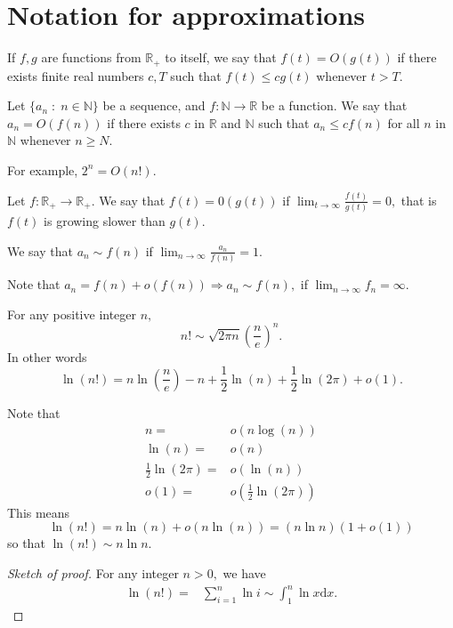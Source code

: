 \section{Notation for approximations}
\begin{definition}[O notation]
	If $f,g$ are functions from $\mathbb{R}_+$ to itself, we say that $f(t) = O(g(t))$ if
	there exists finite real numbers $c, T$ such that $ f(t) \leq c g(t)$ whenever $ t > T.$
\end{definition}

\begin{definition}
	Let $ \{ a_n \; : \; n \in \mathbb{N} \}$ be a sequence,
	and $ f\colon \mathbb{N} \to \mathbb{R}$ be a function.
	We say that $a_n = O(f(n))$ if there exists $ c $ in $\mathbb{R}$ and 
	$\mathbb{N}$ such that $ a_n \leq c f(n)$ for all $n $ in 
	$\mathbb{N}$ whenever $n \geq N.$
\end{definition}
For example, $2^n = O(n!).$
\begin{definition}
	Let $f \colon \mathbb{R}_+ \to \mathbb{R}_+.$
	We say that $f(t) = 0(g(t))$ if $\lim_{t \to \infty} \frac{f(t)}{g(t)} = 0,$
	that is $f(t)$ is growing slower than $g(t).$
\end{definition}
\begin{example}
	We say that $a_n \sim f(n)$ if $\lim_{n \to \infty} \frac{a_n}{f(n)} = 1.$	
\end{example}
Note that $a_n = f(n) + o(f(n)) \Rightarrow a_n \sim f(n),$ if $\lim_{n \to \infty} 
f_n = \infty.$
\begin{theorem}
	For any positive integer $n,$
	$$ n! \sim \sqrt{2 \pi n} \left( \frac{n}{e} \right)^n .$$
	In other words
	$$ \ln(n!) = n \ln \left( \frac{n}{e}  \right) - n + \frac{1}{2} \ln(n)
	+ \frac{1}{2} \ln(2 \pi ) + o(1).$$
\end{theorem}

\begin{remark}
	Note that
	\begin{align*}
		n ={}&  o(n \log (n)) \\
		\ln(n)={}& o(n) \\
		\frac{1}{2} \ln(2 \pi) ={}& o(\ln(n))\\
		o(1) ={}& o\left( \frac{1}{2} \ln(2 \pi) \right)
	\end{align*}
	This means 
	$$ \ln(n!) = n \ln(n) + o(n \ln(n)) = (n \ln n)(1 + o(1))$$
	so that $\ln(n!) \sim n \ln n.$
\end{remark}

\begin{proof}[Sketch of proof]
	For any integer $n > 0,$ we have
	\begin{align*}
		\ln(n!) ={}& \sum_{i=1}^{n} \ln i \sim \int_1^n \ln x \mathrm{d} x.
	\end{align*}
\end{proof}

